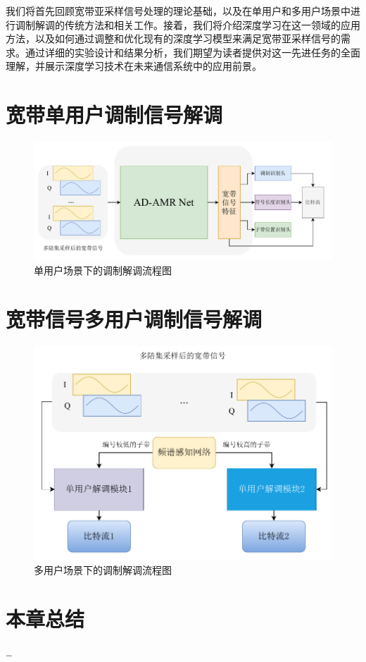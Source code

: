 我们将首先回顾宽带亚采样信号处理的理论基础，以及在单用户和多用户场景中进行调制解调的传统方法和相关工作。接着，我们将介绍深度学习在这一领域的应用方法，以及如何通过调整和优化现有的深度学习模型来满足宽带亚采样信号的需求。通过详细的实验设计和结果分析，我们期望为读者提供对这一先进任务的全面理解，并展示深度学习技术在未来通信系统中的应用前景。

\section{宽带单用户调制信号解调}\label{sec:background}

\begin{figure}
    \centering
    \includegraphics[width=\textwidth]{Image/adamr-wideband_demodulate.pdf}
    \caption{单用户场景下的调制解调流程图}\label{fig:demode_single}
\end{figure}

\section{宽带信号多用户调制信号解调}\label{sec:background}
\begin{figure}
    \centering
    \includegraphics[width=\textwidth]{Image/adamr-wideband_demodulate_mul.pdf}
    \caption{多用户场景下的调制解调流程图}\label{fig:demode_multiple}
\end{figure}

\section{本章总结}\label{sec:background}
\dots
